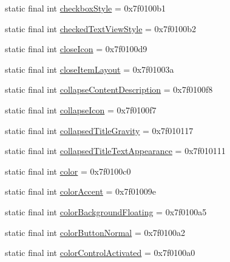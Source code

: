 \begin{CompactItemize}
static final int \hyperlink{classandroid_1_1support_1_1v7_1_1mediarouter_1_1_r_1_1attr_bfcf0b168171c1dfef67e8ba591853dc}{checkboxStyle} = 0x7f0100b1
\item 
static final int \hyperlink{classandroid_1_1support_1_1v7_1_1mediarouter_1_1_r_1_1attr_b68505f886322ae774a16cf0768017d8}{checkedTextViewStyle} = 0x7f0100b2
\item 
static final int \hyperlink{classandroid_1_1support_1_1v7_1_1mediarouter_1_1_r_1_1attr_d6462a3eff792f3b99ba6e401c12d218}{closeIcon} = 0x7f0100d9
\item 
static final int \hyperlink{classandroid_1_1support_1_1v7_1_1mediarouter_1_1_r_1_1attr_b36547976dee3cb254d558dbb9a6cdce}{closeItemLayout} = 0x7f01003a
\item 
static final int \hyperlink{classandroid_1_1support_1_1v7_1_1mediarouter_1_1_r_1_1attr_a7bf0ecd5e115a6f982d4415d283f16a}{collapseContentDescription} = 0x7f0100f8
\item 
static final int \hyperlink{classandroid_1_1support_1_1v7_1_1mediarouter_1_1_r_1_1attr_35086fa3525b4fff2e258e403ec3325a}{collapseIcon} = 0x7f0100f7
\item 
static final int \hyperlink{classandroid_1_1support_1_1v7_1_1mediarouter_1_1_r_1_1attr_f63ce184717aa440f4dbbbcc842be341}{collapsedTitleGravity} = 0x7f010117
\item 
static final int \hyperlink{classandroid_1_1support_1_1v7_1_1mediarouter_1_1_r_1_1attr_a6b2e41af004b5c7ab17609e22018109}{collapsedTitleTextAppearance} = 0x7f010111
\item 
static final int \hyperlink{classandroid_1_1support_1_1v7_1_1mediarouter_1_1_r_1_1attr_52f7173cbe73a4bee56c94f5b9013967}{color} = 0x7f0100c0
\item 
static final int \hyperlink{classandroid_1_1support_1_1v7_1_1mediarouter_1_1_r_1_1attr_384e39dc0be01b0ad5ae15024ecde86e}{colorAccent} = 0x7f01009e
\item 
static final int \hyperlink{classandroid_1_1support_1_1v7_1_1mediarouter_1_1_r_1_1attr_f6785f30df82829d11839c86269f279d}{colorBackgroundFloating} = 0x7f0100a5
\item 
static final int \hyperlink{classandroid_1_1support_1_1v7_1_1mediarouter_1_1_r_1_1attr_09f27eb58acb05d0acc18db8a7c8746b}{colorButtonNormal} = 0x7f0100a2
\item 
static final int \hyperlink{classandroid_1_1support_1_1v7_1_1mediarouter_1_1_r_1_1attr_a103aec5a10d553f6ef21ca70906a05c}{colorControlActivated} = 0x7f0100a0
\item 

\end{CompactItemize}
